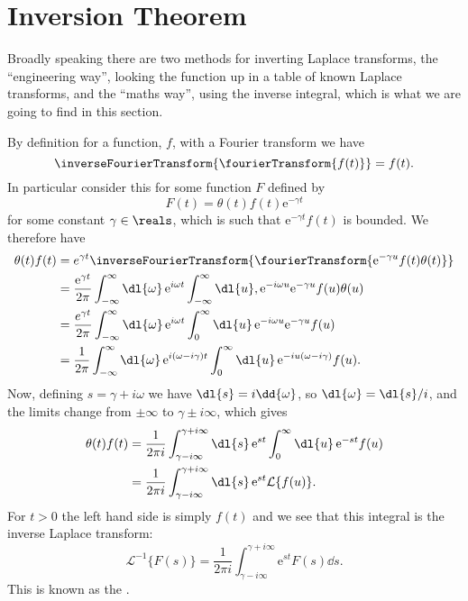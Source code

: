 \documentclass[fleqn]{NotesClass}
\newcommand*{\e}{\mathrm{e}}
\newcommand*{\laplaceTransform}{\mathcal{L}}
\newcommand*{\inverseLaplaceTransform}{\laplaceTransform^{-1}}
\begin{document}
    \section{Inversion Theorem}
    Broadly speaking there are two methods for inverting Laplace transforms, the \enquote{engineering way}, looking the function up in a table of known Laplace transforms, and the \enquote{maths way}, using the inverse integral, which is what we are going to find in this section.
    
    By definition for a function, \(f\), with a Fourier transform we have
    \begin{equation}
        \inverseFourierTransform\{ \fourierTransform\{ f(t) \} \} = f(t).
    \end{equation}
    In particular consider this for some function \(F\) defined by
    \begin{equation}
        F(t) = \theta(t) f(t) \e^{-\gamma t}
    \end{equation}
    for some constant \(\gamma \in \reals\), which is such that \(\e^{-\gamma t}f(t)\) is bounded.
    We therefore have
    \begin{align}
        \theta(t)f(t) &= e^{\gamma t}\inverseFourierTransform\{ \fourierTransform\{ \e^{-\gamma u}f(t)\theta(t) \} \}\\
        &= \frac{\e^{\gamma t}}{2\pi} \int_{-\infty}^{\infty} \dl{\omega} \, \e^{i\omega t} \int_{-\infty}^{\infty} \dl{u} , \e^{-i\omega u} \e^{-\gamma u} f(u) \theta(u)\\
        &= \frac{e^{\gamma t}}{2\pi} \int_{-\infty}^{\infty} \dl{\omega} \, \e^{i\omega t} \int_{0}^{\infty} \dl{u} \, \e^{-i\omega u}\e^{-\gamma u} f(u)\\
        &= \frac{1}{2\pi} \int_{-\infty}^{\infty} \dl{\omega} \, \e^{i(\omega - i\gamma)t} \int_{0}^{\infty} \dl{u} \, \e^{-iu(\omega - i\gamma)} f(u).
    \end{align}
    Now, defining \(s = \gamma + i\omega\) we have \(\dl{s} = i\dd{\omega}\), so \(\dl{\omega} = \dl{s}/i\), and the limits change from \(\pm \infty\) to \(\gamma \pm i\infty\), which gives
    \begin{align}
        \theta(t)f(t) &= \frac{1}{2\pi i} \int_{\gamma - i\infty}^{\gamma + i\infty} \dl{s} \, \e^{st} \int_{0}^{\infty} \dl{u} \, \e^{-st}f(u)\\
        &= \frac{1}{2\pi i} \int_{\gamma - i\infty}^{\gamma + i\infty} \dl{s} \, \e^{st} \laplaceTransform\{ f(u) \}.
    \end{align}
    For \(t > 0\) the left hand side is simply \(f(t)\) and we see that this integral is the inverse Laplace transform:
    \begin{equation}
        \inverseLaplaceTransform\{ F(s) \} = \frac{1}{2\pi i}\int_{\gamma - i\infty}^{\gamma + i\infty} \e^{st} F(s) \dd{s}.
    \end{equation}
    This is known as the .
    
\end{document}
